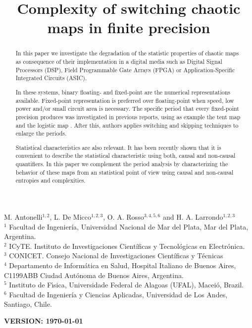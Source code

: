 \begin{frontmatter}

	\title{Complexity of switching chaotic maps in finite precision}
	M. Antonelli$^{1,2}$, L. De Micco$^{1,2,3}$, O. A. Rosso$^{3,4,5,6}$ and H. A. Larrondo$^{1,2,3}$\\
	$^{1}$ Facultad de Ingenier\'ia, Universidad Nacional de Mar del Plata, Mar del Plata, Argentina.\\
	$^{2}$ ICyTE. Instituto de Investigaciones Científicas y Tecnológicas en Electrónica.\\
	$^{3}$ CONICET. Consejo Nacional de Investigaciones Científicas y Técnicas\\
	$^{4}$ Departamento de Inform\'atica en Salud, Hospital Italiano de Buenos Aires, C1199ABB Ciudad Autónoma de Buenos Aires, Argentina.\\
	$^{5}$ Instituto de F\'{\i}sica, Universidade Federal de Alagoas (UFAL), Macei\'o, Brazil.\\
	$^{6}$ Facultad de Ingeniería y Ciencias Aplicadas, Universidad de Los Andes, Santiago, Chile.
	

\begin{abstract}

In this paper we investigate the degradation of the statistic properties of chaotic maps as consequence of their implementation in a digital media such as Digital Signal Processors (DSP), Field Programmable Gate Arrays (FPGA) or Application-Specific Integrated Circuits (ASIC).

In these systems, binary floating- and fixed-point are the numerical representations available.
Fixed-point representation is preferred over floating-point when speed, low power and/or small circuit area is necessary.
The specific period that every fixed-point precision produces was investigated in previous reports, using as example the tent map and the logistic map \cite{Nagaraj2008}.
After this, authors applies switching and skipping techniques to enlarge the periods.

Statistical characteristics are also relevant.
It has been recently shown that it is convenient to describe the statistical characteristic using both, causal and non-causal quantifiers.
In this paper we complement the period analysis by characterizing the behavior of these maps from an statistical point of view using causal and non-causal entropies and complexities.

\end{abstract}
\maketitle
\end{frontmatter}
{\bf VERSION: \today}